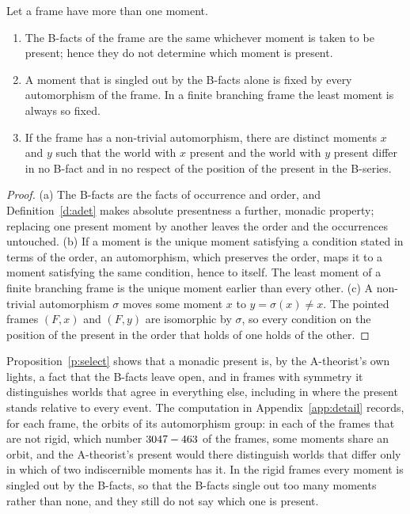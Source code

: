 \documentclass{situationist-preprint}
\begin{document}
\begin{proposition}\label{p:select}
Let a frame have more than one moment.
\begin{enumerate}[label=(\alph*)]
\item The B-facts of the frame are the same whichever moment is taken to be present; hence they do not determine which moment is present.
\item A moment that is singled out by the B-facts alone is fixed by every automorphism of the frame. In a finite branching frame the least moment is always so fixed.
\item If the frame has a non-trivial automorphism, there are distinct moments $x$ and $y$ such that the world with $x$ present and the world with $y$ present differ in no B-fact and in no respect of the position of the present in the B-series.
\end{enumerate}
\end{proposition}

\begin{proof}
(a) The B-facts are the facts of occurrence and order, and Definition~\ref{d:adet} makes absolute presentness a further, monadic property; replacing one present moment by another leaves the order and the occurrences untouched. (b) If a moment is the unique moment satisfying a condition stated in terms of the order, an automorphism, which preserves the order, maps it to a moment satisfying the same condition, hence to itself. The least moment of a finite branching frame is the unique moment earlier than every other. (c) A non-trivial automorphism $\sigma$ moves some moment $x$ to $y = \sigma(x) \ne x$. The pointed frames $(F, x)$ and $(F, y)$ are isomorphic by $\sigma$, so every condition on the position of the present in the order that holds of one holds of the other.
\end{proof}

Proposition~\ref{p:select} shows that a monadic present is, by the A-theorist's own lights, a fact that the B-facts leave open, and in frames with symmetry it distinguishes worlds that agree in everything else, including in where the present stands relative to every event. The computation in Appendix~\ref{app:detail} records, for each frame, the orbits of its automorphism group: in each of the frames that are not rigid, which number $3047 - 463$ of the \NFrames{} frames, some moments share an orbit, and the A-theorist's present would there distinguish worlds that differ only in which of two indiscernible moments has it. In the \NRigid{} rigid frames every moment is singled out by the B-facts, so that the B-facts single out too many moments rather than none, and they still do not say which one is present.
\end{document}

